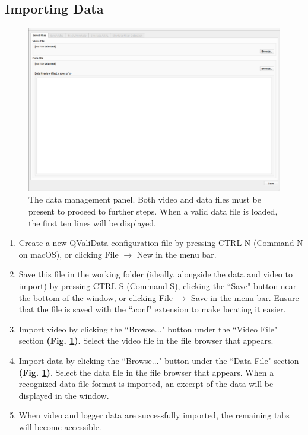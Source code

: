 \documentclass[]{article}
\begin{document}
	\subsection{Importing Data}
	\begin{figure}[H]
		\centering
		\includegraphics[width=1\linewidth]{importdata}
		\caption{The data management panel. Both video and data files must be present to proceed to further steps. When a valid data file is loaded, the first ten lines will be displayed.}
		\label{fig:importdata}
	\end{figure}
	\begin{enumerate}
		\item Create a new QValiData configuration file by pressing CTRL-N (Command-N on macOS), or clicking File $\rightarrow$ New in the menu bar.
		\item Save this file in the working folder (ideally, alongside the data and video to import) by pressing CTRL-S (Command-S), clicking the ``Save" button near the bottom of the window, or clicking File $\rightarrow$ Save in the menu bar. Ensure that the file is saved with the ``.conf" extension to make locating it easier.
		\item Import video by clicking the ``Browse..." button under the ``Video File" section \textbf{(Fig. \ref{fig:importdata})}. Select the video file in the file browser that appears.
		\item Import data by clicking the ``Browse..." button under the ``Data File" section \textbf{(Fig. \ref{fig:importdata})}. Select the data file in the file browser that appears. When a recognized data file format is imported, an excerpt of the data will be displayed in the window. 
		\item When video and logger data are successfully imported, the remaining tabs will become accessible.
	\end{enumerate}
	
\end{document}
